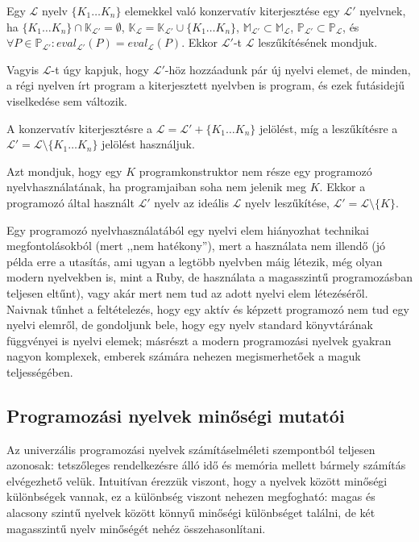 \begin{defn}\label{defn:conservative_extension}
	Egy $\mathcal{L}$ nyelv $\{K_1 \ldots K_n\}$ elemekkel való konzervatív kiterjesztése egy $\mathcal{L}'$ nyelvnek, ha
	$ \{K_1 \ldots K_n\} \cap \mathbb{K}_{\mathcal{L}'} = \emptyset$,
	$\mathbb{K}_\mathcal{L} = \mathbb{K}_{\mathcal{L}'} \cup \{K_1 \ldots K_n\}$,
	$\mathbb{M}_{\mathcal{L}'} \subset \mathbb{M}_\mathcal{L}$, $\mathbb{P}_{\mathcal{L}'} \subset \mathbb{P}_\mathcal{L}$, és $ \forall P \in \mathbb{P}_{\mathcal{L}'}: eval_{\mathcal{L}'}(P) = eval_\mathcal{L}(P)$. Ekkor $\mathcal{L}'$-t $\mathcal{L}$ leszűkítésének mondjuk.

	\normalfont Vagyis $\mathcal{L}$-t úgy kapjuk, hogy $\mathcal{L}'$-höz hozzáadunk pár új nyelvi elemet, de minden, a régi nyelven írt program a kiterjesztett nyelvben is program, és ezek futásidejű viselkedése sem változik.

	\normalfont A konzervatív kiterjesztésre a $\mathcal{L} = \mathcal{L}' + \{K_1 \ldots K_n\}$ jelölést, míg a leszűkítésre a $\mathcal{L}' = \mathcal{L} \setminus \{K_1 \ldots K_n\}$ jelölést használjuk.
\end{defn}


\begin{defn}[Nyelvhasználat]
Azt mondjuk, hogy egy $K$ programkonstruktor nem része egy programozó nyelvhasználatának, ha programjaiban soha nem jelenik meg $K$.
Ekkor a programozó által használt $\mathcal{L}'$ nyelv az ideális $\mathcal{L}$ nyelv leszűkítése, $\mathcal{L}' = \mathcal{L} \setminus \{K\}$.

\normalfont Egy programozó nyelvhasználatából egy nyelvi elem hiányozhat technikai megfontolásokból (mert ,,nem hatékony''), mert a használata nem illendő (jó példa erre a  utasítás, ami ugyan a legtöbb nyelvben máig létezik, még olyan modern nyelvekben is, mint a Ruby, de használata a magasszintű programozásban teljesen eltűnt), vagy akár mert nem tud az adott nyelvi elem létezéséről.
Naivnak tűnhet a feltételezés, hogy egy aktív és képzett programozó nem tud egy nyelvi elemről, de gondoljunk bele, hogy egy nyelv standard könyvtárának függvényei is nyelvi elemek; másrészt a modern programozási nyelvek gyakran nagyon komplexek, emberek számára nehezen megismerhetőek a maguk teljességében.
\end{defn}


\subsection{Programozási nyelvek minőségi mutatói}
Az univerzális programozási nyelvek számításelméleti szempontból teljesen azonosak: tetszőleges rendelkezésre álló idő és memória mellett bármely számítás elvégezhető velük.
Intuitívan érezzük viszont, hogy a nyelvek között minőségi különbségek vannak, ez a különbség viszont nehezen megfogható: magas és alacsony szintű nyelvek között könnyű minőségi különbséget találni, de két magasszintű nyelv minőségét nehéz összehasonlítani.

